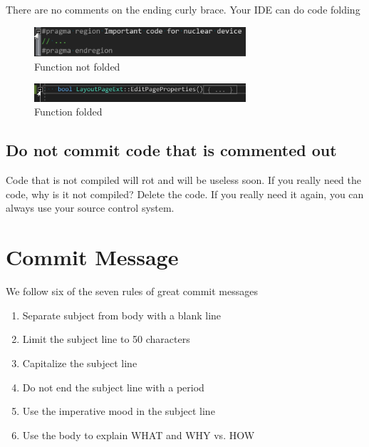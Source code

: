 \documentclass[11pt,a4paper]{article}
\begin{document}
There are no comments on the ending curly brace. Your IDE can do code folding

\begin{figure}[ht]
  \centering
  \includegraphics[width=0.7\textwidth]{code-folding-open.png}
  \caption{Function not folded}
\end{figure}

\begin{figure}[ht]
  \centering
  \includegraphics[width=0.7\textwidth]{code-folding-closed.png}
  \caption{Function folded}
\end{figure}

\subsection{Do not commit code that is commented out}

Code that is not compiled will rot and will be useless soon. If you really need the code, why is it not compiled? Delete the code. If you really need it again, you can always use your source control system.

\section{Commit Message}

We follow six of the seven rules of great commit messages

\begin{enumerate}
  \item Separate subject from body with a blank line
  \item Limit the subject line to 50 characters
  \item Capitalize the subject line
  \item Do not end the subject line with a period
  \item Use the imperative mood in the subject line 
  \item Use the body to explain WHAT and WHY vs. HOW
\end{enumerate}
\end{document}
